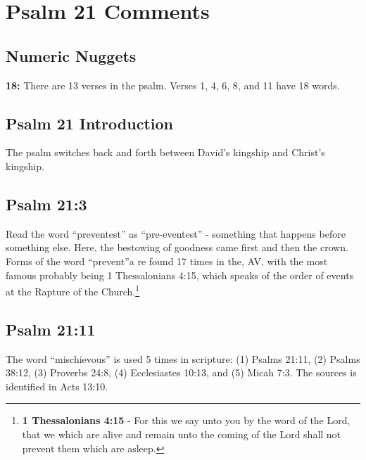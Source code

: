 \section{Psalm 21 Comments}

\subsection{Numeric Nuggets}
\textbf{18:} There are 13 verses in the psalm. Verses 1, 4, 6, 8, and 11 have 18 words. 

\subsection{Psalm 21 Introduction}
The psalm switches back and forth between David's kingship and Christ's kingship.

\subsection{Psalm 21:3}
Read the word ``preventest'' as ``pre-eventest'' - something that happens before something else. Here, the bestowing of goodness came first and then the crown.  Forms of the word ``prevent''a re found 17 times in the, AV, with the most famous probably being 1 Thessalonians 4:15, which speaks of the order of events at the Rapture of the Church.\footnote{\textbf{1 Thessalonians 4:15} - For this we say unto you by the word of the Lord, that we which are alive and remain unto the coming of the Lord shall not prevent them which are asleep.}

\subsection{Psalm 21:11}
The word ``mischievous'' is used 5 times in scripture: (1) Psalms 21:11, (2) Psalms 38:12, (3) Proverbs 24:8, (4) Ecclesiastes 10:13, and (5) Micah 7:3. The sources is identified in Acts 13:10.

